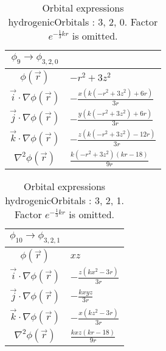 \begin{table}
\begin{center}
\begin{tabular}{c|l}
$\phi_{9} \rightarrow \phi_{3, 2, 0}$\\
\hline
$\phi(\vec r)$ & $- r^{2} + 3 z^{2}$\\
\hline
$\vec i\cdot \nabla \phi(\vec r)$ & $- \frac{x \left(k \left(- r^{2} + 3 z^{2}\right) + 6 r\right)}{3 r}$\\
$\vec j\cdot \nabla \phi(\vec r)$ & $- \frac{y \left(k \left(- r^{2} + 3 z^{2}\right) + 6 r\right)}{3 r}$\\
$\vec k\cdot \nabla \phi(\vec r)$ & $- \frac{z \left(k \left(- r^{2} + 3 z^{2}\right) - 12 r\right)}{3 r}$\\
\hline
$\nabla^2 \phi(\vec r)$ & $\frac{k \left(- r^{2} + 3 z^{2}\right) \left(k r -18\right)}{9 r}$\\
\end{tabular}
\caption{Orbital expressions hydrogenicOrbitals : 3, 2, 0. Factor $e^{- \frac{1}{3} k r}$ is omitted.}
\end{center}
\end{table}


\begin{table}
\begin{center}
\begin{tabular}{c|l}
$\phi_{10} \rightarrow \phi_{3, 2, 1}$\\
\hline
$\phi(\vec r)$ & $x z$\\
\hline
$\vec i\cdot \nabla \phi(\vec r)$ & $- \frac{z \left(k x^{2} - 3 r\right)}{3 r}$\\
$\vec j\cdot \nabla \phi(\vec r)$ & $- \frac{k x y z}{3 r}$\\
$\vec k\cdot \nabla \phi(\vec r)$ & $- \frac{x \left(k z^{2} - 3 r\right)}{3 r}$\\
\hline
$\nabla^2 \phi(\vec r)$ & $\frac{k x z \left(k r -18\right)}{9 r}$\\
\end{tabular}
\caption{Orbital expressions hydrogenicOrbitals : 3, 2, 1. Factor $e^{- \frac{1}{3} k r}$ is omitted.}
\end{center}
\end{table}


